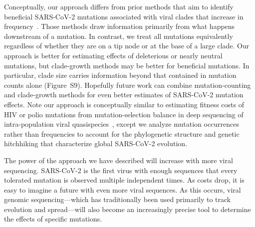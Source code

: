 \documentclass[9pt,twocolumn,twoside]{gsajnl_modified}
\begin{document}
Conceptually, our approach differs from prior methods that aim to identify beneficial SARS-CoV-2 mutations associated with viral clades that increase in frequency~\citep{obermeyer2022analysis,lee2022inferring,maher2022predicting}.
Those methods draw information primarily from what happens downstream of a mutation.
In contrast, we treat all mutations equivalently regardless of whether they are on a tip node or at the base of a large clade.
Our approach is better for estimating effects of deleterious or nearly neutral mutations, but clade-growth methods may be better for beneficial mutations.
In particular, clade size carries information beyond that contained in mutation counts alone (Figure~S9).
Hopefully future work can combine mutation-counting and clade-growth methods for even better estimates of SARS-CoV-2 mutation effects.
Note our approach is conceptually similar to estimating fitness costs of HIV or polio mutations from mutation-selection balance in deep sequencing of intra-population viral quasispecies~\citep{zanini2017vivo, acevedo2014mutational}, except we analyze mutation occurrences rather than frequencies to account for the phylogenetic structure and genetic hitchhiking that characterize global SARS-CoV-2 evolution.

The power of the approach we have described will increase with more viral sequencing.
SARS-CoV-2 is the first virus with enough sequences that every tolerated mutation is observed multiple independent times.
As costs drop, it is easy to imagine a future with even more viral sequences.
As this occurs, viral genomic sequencing---which has traditionally been used primarily to track evolution and spread---will also become an increasingly precise tool to determine the effects of specific mutations.
\end{document}
